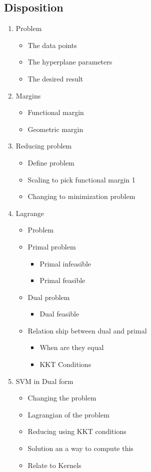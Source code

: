 \documentclass[a4, english]{article}
\begin{document}
\subsection{Disposition}
\begin{enumerate}
	\item Problem 
  \begin{itemize}
  	\item The data points
    \item The hyperplane parameters
    \item The desired result
  \end{itemize}
  \item Margins
  \begin{itemize}
  	\item Functional margin
    \item Geometric margin
  \end{itemize}
  \item Reducing problem
  \begin{itemize}
  	\item Define problem
    \item Scaling to pick functional margin 1
    \item Changing to minimization problem 
  \end{itemize}
  \item Lagrange
  \begin{itemize}
  	\item Problem
    \item Primal problem
    \begin{itemize}
    	\item Primal infeasible
      \item Primal feasible
    \end{itemize}
    \item Dual problem
    \begin{itemize}
    	\item Dual feasible
    \end{itemize}
    \item Relation ship between dual and primal
    \begin{itemize}
    	\item When are they equal 
      \item KKT Conditions 
    \end{itemize}
  \end{itemize}
  \item SVM in Dual form
  \begin{itemize}
  	\item Changing the problem
    \item Lagrangian of the problem 
    \item Reducing using KKT conditions 
    \item Solution an a way to compute this
    \item Relate to Kernels 
  \end{itemize}
\end{enumerate}
\newpage
\end{document}
